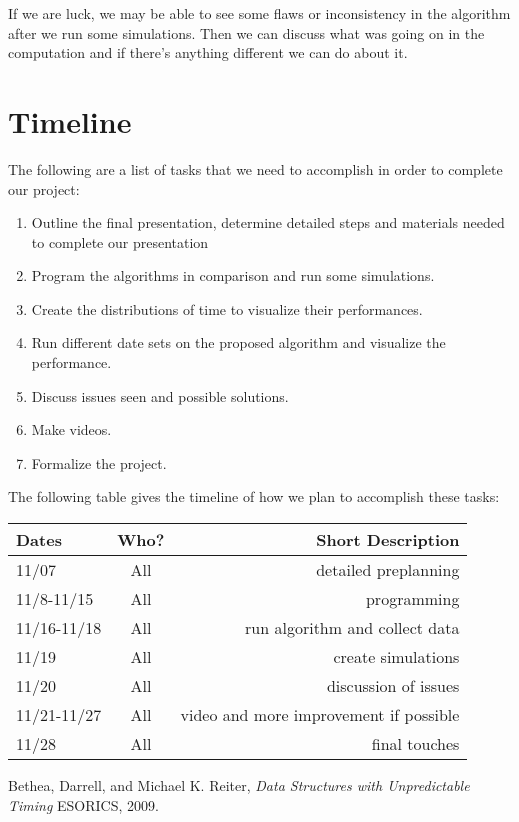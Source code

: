\documentclass[11pt,twocolumn]{article}
\begin{document}
If we are luck, we may be able to see some flaws or inconsistency in the algorithm after we run some simulations. Then we can discuss what was going on in the computation and if there's anything different we can do about it.


%
% 

\newpage
\onecolumn
\appendix
\section{Timeline}

The following are a list of tasks that we need to accomplish in order to 
complete our project:

\begin{enumerate}
\item Outline the final presentation, determine detailed steps and
materials needed to complete our presentation

\item Program the algorithms in comparison and run some simulations.

\item Create the distributions of time to visualize their performances.

\item Run different date sets on the proposed algorithm and visualize the performance.

\item Discuss issues seen and possible solutions.

\item Make videos.

\item Formalize the project.
\end{enumerate}

The following table gives the timeline of how we plan to accomplish these tasks:

\begin{table}[h!]
\centering
\begin{tabular}{ |l | c | r|}
  \hline
  Dates & Who? & Short Description \\
  \hline
  \hline
  
  \hline
  11/07 & All & detailed preplanning \\
  \hline
  11/8-11/15 & All & programming \\
  \hline
  11/16-11/18 & All & run algorithm and collect data \\
  \hline
  11/19 & All & create simulations \\
  \hline
  11/20 & All & discussion of issues \\
  \hline
  11/21-11/27 & All & video and more improvement if possible \\
  \hline
  11/28 & All & final touches \\
  \hline
\end{tabular}
\end{table}

\pagebreak

\begin{thebibliography}{9}
	
	Bethea, Darrell, and Michael K. Reiter,
	\emph{Data Structures with Unpredictable Timing}
	ESORICS,
	2009.
	
\end{thebibliography}
\end{document}
